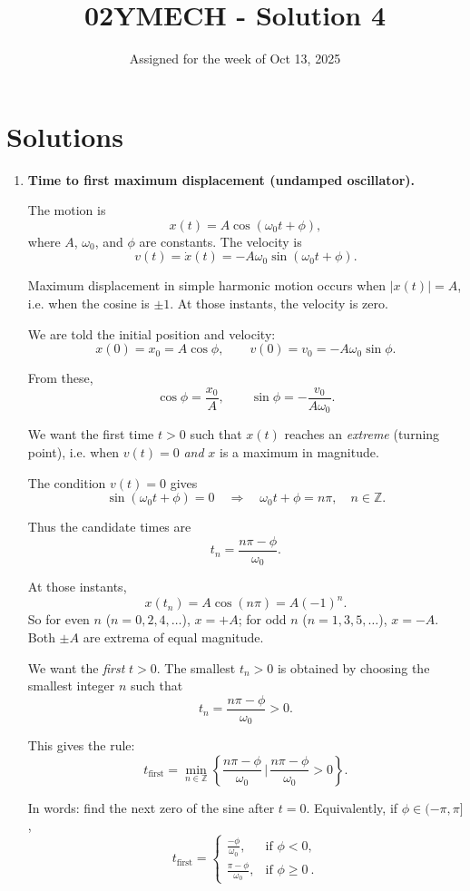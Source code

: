 \documentclass[12pt]{article}
\title{02YMECH - Solution 4}
\date{Assigned for the week of Oct 13, 2025}
\author{}
\begin{document}
\maketitle

\section*{Solutions}

\begin{enumerate}

\item \textbf{Time to first maximum displacement (undamped oscillator).}

The motion is
\[
x(t) = A \cos(\omega_0 t + \phi),
\]
where $A$, $\omega_0$, and $\phi$ are constants. The velocity is
\[
v(t) = \dot{x}(t) = -A \omega_0 \sin(\omega_0 t + \phi).
\]

Maximum displacement in simple harmonic motion occurs when $|x(t)| = A$, i.e. when the cosine is $\pm 1$. At those instants, the velocity is zero.

We are told the initial position and velocity:
\[
x(0) = x_0 = A \cos \phi,
\qquad
v(0) = v_0 = -A \omega_0 \sin \phi.
\]

From these,
\[
\cos \phi = \frac{x_0}{A},
\qquad
\sin \phi = - \frac{v_0}{A \omega_0}.
\]

We want the first time $t>0$ such that $x(t)$ reaches an \emph{extreme} (turning point), i.e. when $v(t)=0$ \emph{and} $x$ is a maximum in magnitude.

The condition $v(t)=0$ gives
\[
\sin(\omega_0 t + \phi) = 0
\quad \Longrightarrow \quad
\omega_0 t + \phi = n\pi,
\quad n \in \mathbb{Z}.
\]

Thus the candidate times are
\[
t_n = \frac{n\pi - \phi}{\omega_0}.
\]

At those instants,
\[
x(t_n) = A \cos(n\pi) = A(-1)^n.
\]
So for even $n$ ($n=0,2,4,\dots$), $x = +A$; for odd $n$ ($n=1,3,5,\dots$), $x = -A$. Both $\pm A$ are extrema of equal magnitude.

We want the \emph{first} $t>0$. The smallest $t_n>0$ is obtained by choosing the smallest integer $n$ such that
\[
t_n = \frac{n\pi - \phi}{\omega_0} > 0.
\]

This gives the rule:
\[
t_{\text{first}} = \min_{n \in \mathbb{Z}} \left\{ \frac{n\pi - \phi}{\omega_0} \, \Big| \, \frac{n\pi - \phi}{\omega_0} > 0 \right\}.
\]

In words: find the next zero of the sine after $t=0$. Equivalently, if $\phi \in (-\pi,\pi]$,
\[
t_{\text{first}} =
\begin{cases}
\displaystyle \frac{-\phi}{\omega_0}, & \text{if } \phi < 0, \\[1em]
\displaystyle \frac{\pi - \phi}{\omega_0}, & \text{if } \phi \ge 0~.
\end{cases}
\]


\end{enumerate}
\end{document}
